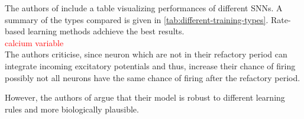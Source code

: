 The authors of \cite{SNN} include a table visualizing performances of different \acp{SNN}.
A summary of the types compared is given in \autoref{tab:different-training-types}.
Rate-based learning methods adchieve the best results.
\textcolor{red}{\\calcium variable\\}
The authors criticise, since neuron which are not in their refactory period can integrate incoming excitatory potentials and thus, 
increase their chance of firing possibly not all neurons have the same chance of firing after the refactory period.

However, the authors of \cite{SNN} argue that their model is robust to different learning rules and more biologically plausible.
